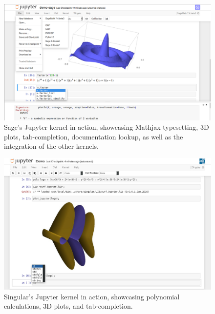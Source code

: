 \documentclass{deliverablereport}
\begin{document}
\begin{figure}
  \includegraphics[height=.4\textheight]{sage.png}
  \caption{Sage's Jupyter kernel in action, showcasing Mathjax
    typesetting, 3D plots, tab-completion, documentation lookup, as
    well as the integration of the other kernels.}
\end{figure}
\begin{figure}
  \includegraphics[height=.4\textheight]{singular.png}
  \caption{Singular's Jupyter kernel in action, showcasing polynomial
    calculations, 3D plots, and tab-completion.}
\end{figure}
\clearpage
\end{document}
